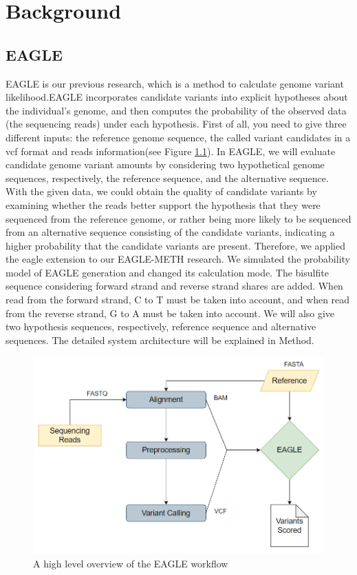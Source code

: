 \documentclass{PHlab-thesis}
\begin{document}
\chapter{Background}
\section{EAGLE}
EAGLE is our previous research, which is a method to calculate genome variant likelihood.EAGLE incorporates candidate variants into explicit hypotheses about the individual’s genome, and then computes the probability of the observed data (the sequencing reads) under each hypothesis. First of all, you need to give three different inputs: the reference genome sequence, the called variant candidates in a vcf format and reads information(see Figure \ref{fig:eagle_workflow}). In EAGLE, we will evaluate candidate genome variant amounts by considering two hypothetical genome sequences, respectively, the reference sequence, and the alternative sequence. With the given data, we could obtain the quality of candidate variants by examining whether the reads better support the hypothesis that they were sequenced from the reference genome, or rather being more likely to be sequenced from an alternative sequence consisting of the candidate variants, indicating a higher probability that the candidate variants are present.
Therefore, we applied the eagle extension to our EAGLE-METH research. We simulated the probability model of EAGLE generation and changed its calculation mode. The bisulfite sequence considering forward strand and reverse strand shares are added. When read from the forward strand, C to T must be taken into account, and when read from the reverse strand, G to A must be taken into account. We will also give two hypothesis sequences, respectively, reference sequence and alternative sequences. The detailed system architecture will be explained in Method.

\begin{figure}[h]
    \centering
    \includegraphics[scale=0.8]{figures/eagle_workflow.PNG}
    \caption{A high level overview of the EAGLE workflow}
    \label{fig:eagle_workflow}
\end{figure}
\end{document}
